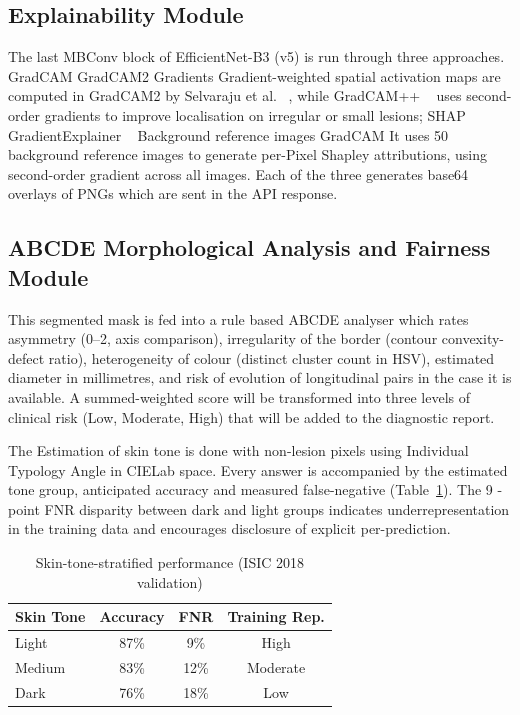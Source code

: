 \documentclass[conference]{IEEEtran}
\begin{document}
\subsection{Explainability Module}

The last MBConv block of EfficientNet-B3 (v5) is run through three approaches. GradCAM GradCAM2 Gradients Gradient-weighted spatial activation maps are computed in GradCAM2 by Selvaraju et al. ~\cite{selvaraju2017gradcam}, while GradCAM++ ~\cite{chattopadhay2018gradcampp} uses second-order gradients to improve localisation on irregular or small lesions; SHAP GradientExplainer ~\cite{lundberg2017shap} Background reference images GradCAM It uses 50 background reference images to generate per-Pixel Shapley attributions, using second-order gradient across all images. Each of the three generates base64 overlays of PNGs which are sent in the API response.

\subsection{ABCDE Morphological Analysis and Fairness Module}

This segmented mask is fed into a rule based ABCDE analyser which rates asymmetry (0--2, axis comparison), irregularity of the border (contour convexity-defect ratio), heterogeneity of colour (distinct cluster count in HSV), estimated diameter in millimetres, and risk of evolution of longitudinal pairs in the case it is available. A summed-weighted score will be transformed into three levels of clinical risk (Low, Moderate, High) that will be added to the diagnostic report.

The Estimation of skin tone is done with non-lesion pixels using Individual Typology Angle in CIELab space. Every answer is accompanied by the estimated tone group, anticipated accuracy and measured false-negative (Table~\ref{tab:fairness}). The 9 -point FNR disparity between dark and light groups indicates underrepresentation in the training data and encourages disclosure of explicit per-prediction.


\begin{table}[h]
\centering
\caption{Skin-tone-stratified performance (ISIC 2018 validation)}
\label{tab:fairness}
\begin{tabular}{lccc}
\hline
Skin Tone & Accuracy & FNR & Training Rep. \\
\hline
Light  & 87\% &  9\% & High \\
Medium & 83\% & 12\% & Moderate \\
Dark   & 76\% & 18\% & Low \\
\hline
\end{tabular}
\end{table}
\end{document}

